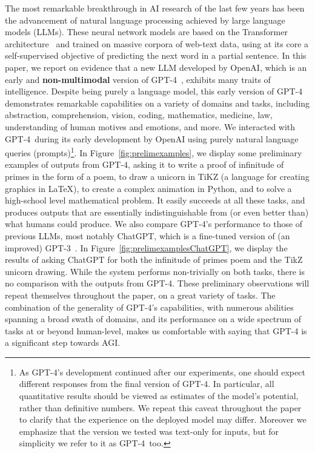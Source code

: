     The most remarkable breakthrough in AI research of the last few years has been the advancement of natural language processing achieved by large language models (LLMs). These neural network models are based on the Transformer architecture~\cite{Vas17} and trained on massive corpora of web-text data, using at its core a self-supervised objective of predicting the next word in a partial sentence. In this paper, we report on evidence that a new LLM developed by OpenAI, which is an early and \textbf{non-multimodal} version of GPT-4\ \cite{gpt4}, exhibits many traits of intelligence. Despite being purely a language model, this early version of {GPT-4} demonstrates remarkable capabilities on a variety of domains and tasks, including abstraction, comprehension, vision, coding, mathematics, medicine, law, understanding of human motives and emotions, and more. We interacted with GPT-4\ during its early development by OpenAI using purely natural language queries (prompts)\footnote{As GPT-4’s development continued after our experiments, one should expect different responses from the final version of GPT-4. In particular, all quantitative results should be viewed as estimates of the model’s potential, rather than definitive numbers. We repeat this caveat throughout the paper to clarify that the experience on the deployed model may differ. Moreover we emphasize that the version we tested was text-only for inputs, but for simplicity we refer to it as GPT-4\ too.}. In Figure~\ref{fig:prelimexamples}, we display some preliminary examples of outputs from {GPT-4}, asking it to write a proof of infinitude of primes in the form of a poem, to draw a unicorn in TiKZ (a language for creating graphics in \LaTeX), to create a complex animation in Python, and to solve a high-school level mathematical problem. It easily succeeds at all these tasks, and produces outputs that are essentially indistinguishable from (or even better than) what humans could produce. We also compare GPT-4's performance to those of previous LLMs, most notably ChatGPT, which is a fine-tuned version of (an improved) GPT-3~\cite{gpt3}. In Figure~\ref{fig:prelimexamplesChatGPT}, we display the results of asking ChatGPT for both the infinitude of primes poem and the TikZ unicorn drawing. While the system performs non-trivially on both tasks, there is no comparison with the outputs from GPT-4. These preliminary observations will repeat themselves throughout the paper, on a great variety of tasks. The combination of the generality of GPT-4's capabilities, with numerous abilities spanning a broad swath of domains, and its performance on a wide spectrum of tasks at or beyond human-level, makes us comfortable with saying that {GPT-4} is a significant step towards AGI.

